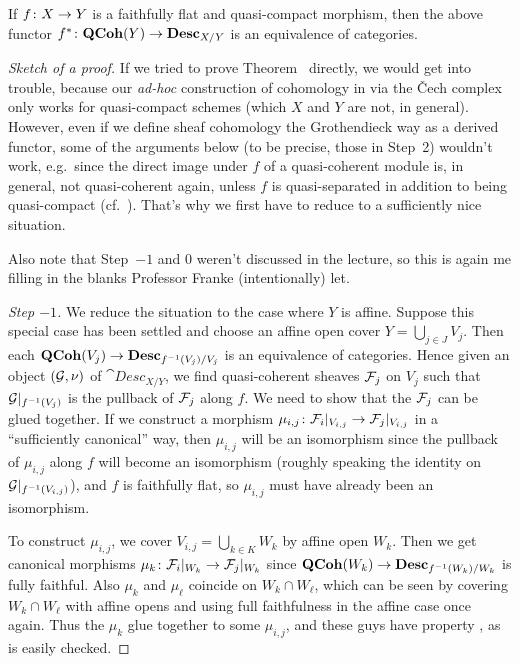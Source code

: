 \documentclass[a4paper,parskip=half,numbers=enddot, DIV=12]{scrreprt}
\begin{document}
\begin{thm}
	If $f\colon X\morphism Y$ is a faithfully flat and quasi-compact morphism, then the above functor $f^*\colon\cat{QCoh}(Y)\morphism\cat{Desc}_{X/Y}$ is an equivalence of categories.
\end{thm}
\begin{proof}[Sketch of a proof]
	If we tried to prove Theorem~ directly, we would get into trouble, because our \emph{ad-hoc} construction of cohomology in \cite[Section~1.2]{alggeo2} via the \v Cech complex only works for quasi-compact schemes (which $X$ and $Y$ are not, in general). However, even if we define sheaf cohomology the Grothendieck way as a derived functor, some of the arguments below (to be precise, those in Step~2) wouldn't work, e.g.\ since the direct image under $f$ of a quasi-coherent module is, in general, not quasi-coherent again, unless $f$ is quasi-separated in addition to being quasi-compact (cf.\ \cite[Proposition~1.5.2]{alggeo1}). That's why we first have to reduce to a sufficiently nice situation.
	
	Also note that Step~$-1$ and 0 weren't discussed in the lecture, so this is again me filling in the blanks Professor Franke (intentionally) let.
	
	\emph{Step $-\text{1}$.} We reduce the situation to the case where $Y$ is affine. Suppose this special case has been settled and choose an affine open cover $Y=\bigcup_{j\in J}V_j$. Then each $\cat{QCoh}(V_j)\morphism\cat{Desc}_{f^{-1}(V_j)/V_j}$ is an equivalence of categories. Hence given an object $(\mathcal{G},\nu)$ of $\cat{Desc}_{X/Y}$, we find quasi-coherent sheaves $\mathcal{F}_j$ on $V_j$ such that $\mathcal{G}|_{f^{-1}(V_j)}$ is the pullback of $\mathcal{F}_j$ along $f$. We need to show that the $\mathcal{F}_j$ can be glued together. If we construct a morphism $\mu_{i,j}\colon \Ff_i|_{V_{i,j}}\morphism\Ff_j|_{V_{i,j}}$ in a ``sufficiently canonical'' way, then $\mu_{i,j}$ will be an isomorphism since the pullback of $\mu_{i,j}$ along $f$ will become an isomorphism (roughly speaking the identity on $\mathcal{G}|_{f^{-1}(V_{i,j})}$), and $f$ is faithfully flat, so $\mu_{i,j}$ must have already been an isomorphism.
	
	To construct $\mu_{i,j}$, we cover $V_{i,j}=\bigcup_{k\in K}W_k$ by affine open $W_k$. Then we get canonical morphisms $\mu_k\colon \Ff_i|_{W_k}\morphism\Ff_j|_{W_k}$ since $\cat{QCoh}(W_k)\morphism\cat{Desc}_{f^{-1}(W_k)/W_k}$ is fully faithful. Also $\mu_k$ and $\mu_\ell$ coincide on $W_k\cap W_\ell$, which can be seen by covering $W_k\cap W_\ell$ with affine opens and using full faithfulness in the affine case once again. Thus the $\mu_k$ glue together to some $\mu_{i,j}$, and these guys have property , as is easily checked.
	

\end{proof}
\end{document}
